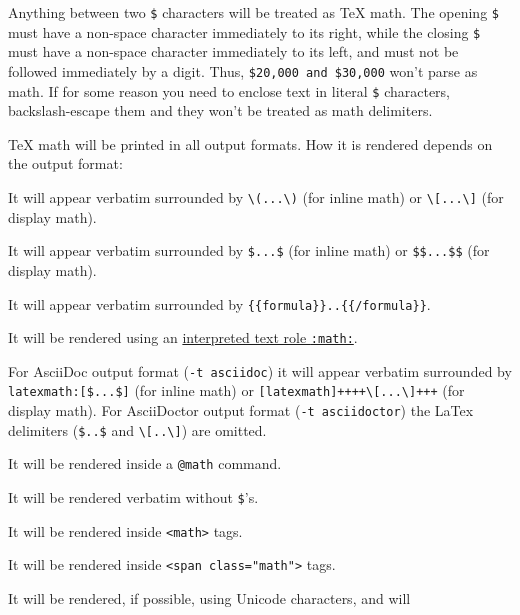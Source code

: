 \documentclass[
]{article}
\providecommand{\tightlist}{%
  \setlength{\itemsep}{0pt}\setlength{\parskip}{0pt}}
\begin{document}
Anything between two \texttt{\$} characters will be treated as TeX math.
The opening \texttt{\$} must have a non-space character immediately to
its right, while the closing \texttt{\$} must have a non-space character
immediately to its left, and must not be followed immediately by a
digit. Thus, \texttt{\$20,000\ and\ \$30,000} won't parse as math. If
for some reason you need to enclose text in literal \texttt{\$}
characters, backslash-escape them and they won't be treated as math
delimiters.

TeX math will be printed in all output formats. How it is rendered
depends on the output format:

\begin{description}
\tightlist
\item[LaTeX]
It will appear verbatim surrounded by
\texttt{\textbackslash{}(...\textbackslash{})} (for inline math) or
\texttt{\textbackslash{}{[}...\textbackslash{}{]}} (for display math).
\item[Markdown, Emacs Org mode, ConTeXt, ZimWiki]
It will appear verbatim surrounded by \texttt{\$...\$} (for inline math)
or \texttt{\$\$...\$\$} (for display math).
\item[XWiki]
It will appear verbatim surrounded by
\texttt{\{\{formula\}\}..\{\{/formula\}\}}.
\item[reStructuredText]
It will be rendered using an
\href{http://docutils.sourceforge.net/docs/ref/rst/roles.html\#math}{interpreted
text role \texttt{:math:}}.
\item[AsciiDoc]
For AsciiDoc output format (\texttt{-t\ asciidoc}) it will appear
verbatim surrounded by \texttt{latexmath:{[}\$...\${]}} (for inline
math) or
\texttt{{[}latexmath{]}++++\textbackslash{}{[}...\textbackslash{}{]}+++}
(for display math). For AsciiDoctor output format
(\texttt{-t\ asciidoctor}) the LaTex delimiters (\texttt{\$..\$} and
\texttt{\textbackslash{}{[}..\textbackslash{}{]}}) are omitted.
\item[Texinfo]
It will be rendered inside a \texttt{@math} command.
\item[roff man]
It will be rendered verbatim without \texttt{\$}'s.
\item[MediaWiki, DokuWiki]
It will be rendered inside \texttt{\textless{}math\textgreater{}} tags.
\item[Textile]
It will be rendered inside
\texttt{\textless{}span\ class="math"\textgreater{}} tags.
\item[RTF, OpenDocument]
It will be rendered, if possible, using Unicode characters, and will

\end{description}
\end{document}
